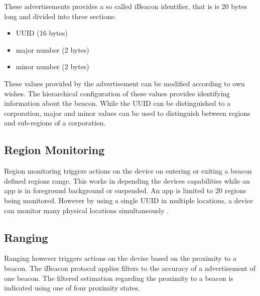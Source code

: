 These advertisements provides a so called iBeacon identifier, that is is 20 bytes long and divided into three sections:

\begin{itemize}
    \item UUID (16 bytes)
    \item major number (2 bytes)
    \item minor number (2 bytes)
\end{itemize}

These values provided by the advertisement can be modified according to own wishes.
The hierarchical configuration of these values provides identifying information about the beacon. While the UUID can be distinguished to a corporation, major and minor values can be used to distinguish between regions and sub-regions of a corporation.


\subsection{Region Monitoring}

Region monitoring triggers actions on the device on entering or exiting a beacon defined regions range. This works in depending the devices capabilities while an app is in foreground background or suspended. An app is limited to 20 regions being monitored. However by using a single UUID in multiple locations, a device can monitor many physical locations simultaneously \cite{iBeacon}.


\subsection{Ranging}

Ranging however triggers actions on the devise based on the proximity to a beacon.
The iBeacon protocol applies filters to the accuracy of a advertisement of one beacon. The filtered estimation regarding the proximity to a beacon is indicated using one of four proximity states.

